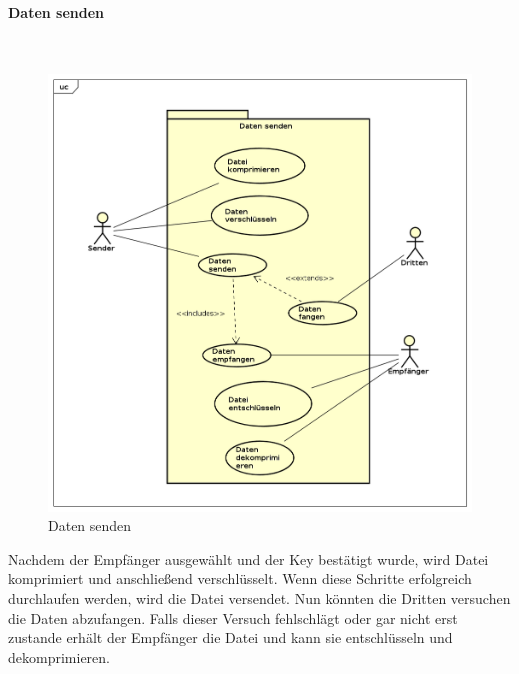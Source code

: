 \paragraph{Daten senden}\mbox{}\\
\begin{figure}[H]
	\centering
	\includegraphics[width= 0.9\linewidth]{diagramms/useCase/daten_senden.png}
	\caption{Daten senden}
\end{figure}
Nachdem der Empfänger ausgewählt und der Key bestätigt wurde, wird Datei komprimiert und anschließend verschlüsselt. Wenn diese Schritte erfolgreich durchlaufen werden, wird die Datei versendet. Nun könnten die Dritten versuchen die Daten abzufangen. Falls dieser Versuch fehlschlägt oder gar nicht erst zustande erhält  der Empfänger die Datei und kann sie entschlüsseln und dekomprimieren.
\newpage
